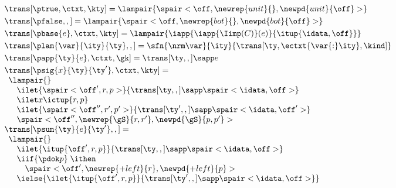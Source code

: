 \begin{figure}
\[
\begin{array}{l}
\trans[\ptrue,\ctxt,\kty] =
  \lampair{\spair<\off,\newrep{unit}{},\newpd{unit}{\off}>}
\\[3pt] %
\trans[\pfalse,,] =
  \lampair{\spair<\off,\newrep {bot}{},\newpd {bot}{\off}>}
\\[3pt] %
\trans[\pbase{e},\ctxt,\kty] =
  \lampair{\iapp {\iapp {\Iimp(C)} (e)} {\itup {\idata,\off}}}
\\[3pt] %
\trans[\plam{\var}{\ity}{\ty},,] =
   \sfn{\nrm\var}{\ity}{\trans[\ty,\ectxt{\var{:}\ity},\kind]}
\\[3pt] %
\trans[\papp{\ty}{e},\ctxt,\gk] =
  \trans[\ty,,] \sapp e  
\\[3pt]
\trans[\psig{x}{\ty}{\ty'},\ctxt,\kty] = \\
  \begin{array}{l}  
    \lampair{} \\
    \quad  \ilet {\spair<\off',r,p>} 
    {{\trans[\ty,,]} \sapp \spair<\idata,\off>} \\
    \quad  \ilet x {\ictup{r,p}}\\
    \quad  \ilet {\spair<\off'',r',p'>} 
    {{\trans[\ty',,]} \sapp \spair<\idata,\off'>} \\
    \quad \spair<\off'',\newrep {\gS}{r,r'},\newpd {\gS}{p,p'}>
  \end{array}  
\\
  \trans[\psum{\ty}{e}{\ty'},,] = \\
  \begin{array}{l}  
  \lampair{} \\
  \quad \ilet {\itup{\off',r,p}}{\trans[\ty,,] \sapp \spair<\idata,\off>} \\
  \quad \iif {\pdok p} \; \ithen \\
  \qquad{
    \def \r {\newrep {+left}{r}}
    \def \p {\newpd {+left}{p}}
    \spair<\off',\r,\p>} \\
  \quad \ielse {\ilet {\itup{\off',r,p}}{\trans[\ty',,] \sapp \spair<\idata,\off>}} \\
  \quad 
  {  %
}
\end{array}
\end{array}\]
\end{figure}

